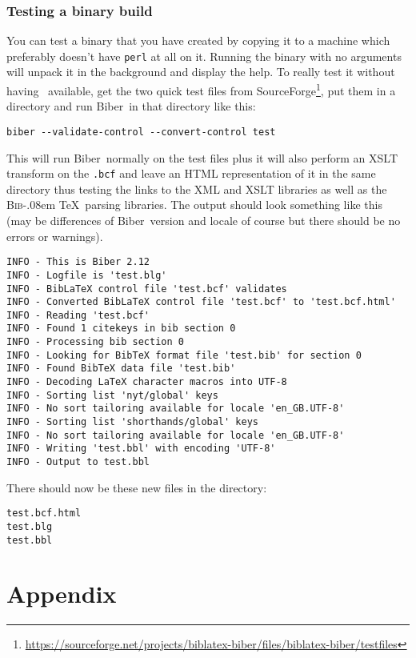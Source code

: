 \documentclass{ltxdockit}
\def\BibTeX{\textsc{Bib}\kern-.08em \TeX}
\newcommand*{\biber}{Biber\xspace}
\begin{document}
\subsubsection{Testing a binary build}
You can test a binary that you have created by copying it to a machine
which preferably doesn't have \verb+perl+ at all on it. Running the binary with no
arguments will unpack it in the background and display the help. To really
test it without having \latex\ available, get the two quick test files from
SourceForge\footnote{\url{https://sourceforge.net/projects/biblatex-biber/files/biblatex-biber/testfiles}},
put them in a directory and run \biber\ in that directory like this:

\begin{verbatim}
biber --validate-control --convert-control test
\end{verbatim}

\noindent This will run \biber\ normally on the test files plus it
will also perform an XSLT transform on the \verb+.bcf+ and
leave an HTML representation of it in the same directory thus testing the
links to the XML and XSLT libraries as well as the \BibTeX\ parsing
libraries. The output should look something like this (may be differences
of \biber\ version and locale of course but there should be no errors
or warnings).

\begin{verbatim}
INFO - This is Biber 2.12
INFO - Logfile is 'test.blg'
INFO - BibLaTeX control file 'test.bcf' validates
INFO - Converted BibLaTeX control file 'test.bcf' to 'test.bcf.html'
INFO - Reading 'test.bcf'
INFO - Found 1 citekeys in bib section 0
INFO - Processing bib section 0
INFO - Looking for BibTeX format file 'test.bib' for section 0
INFO - Found BibTeX data file 'test.bib'
INFO - Decoding LaTeX character macros into UTF-8
INFO - Sorting list 'nyt/global' keys
INFO - No sort tailoring available for locale 'en_GB.UTF-8'
INFO - Sorting list 'shorthands/global' keys
INFO - No sort tailoring available for locale 'en_GB.UTF-8'
INFO - Writing 'test.bbl' with encoding 'UTF-8'
INFO - Output to test.bbl
\end{verbatim}

\noindent There should now be these new files in the directory:

\begin{verbatim}
test.bcf.html
test.blg
test.bbl
\end{verbatim}

\appendix
\section{Appendix}
\end{document}
